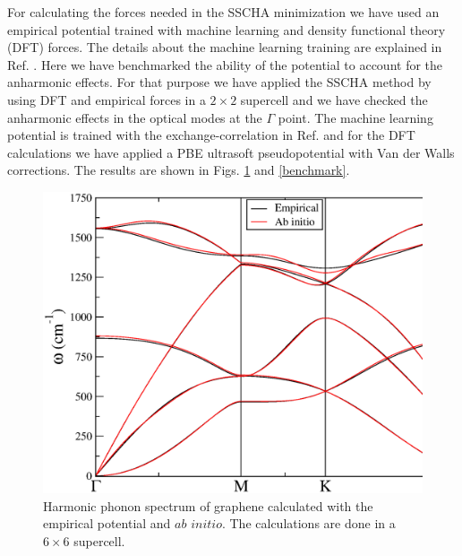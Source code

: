 For calculating the forces needed in the SSCHA minimization\cite{errea2014anharmonic} we have used an empirical 
potential trained with machine learning and density functional theory (DFT) forces. The details about the machine 
learning training are explained in Ref. \cite{rowe2018development}. Here we have benchmarked the ability of 
the potential to account for the anharmonic effects. For that purpose we have applied the SSCHA method by using 
DFT and empirical forces in a $2\times2$ supercell and we have checked the anharmonic effects in the optical 
modes at the $\Gamma$ point. The machine learning potential is trained with the exchange-correlation in 
Ref. \cite{dion2004van} and for the DFT calculations we have applied a PBE\cite{perdew1996generalized} 
ultrasoft pseudopotential\cite{vanderbilt1990soft} with Van der Walls corrections\cite{barone2009role}. The 
results are shown in Figs. \ref{benchmark-spectrum} and \ref{benchmark}.
\begin{figure}[ht]
\includegraphics[width=0.99\linewidth]{Figures/abinito-vs-empirical.eps}
\caption[Harmonic phonon spectrum of graphene calculated with the empirical                                 
        potential and $ab$ $initio$.]{Harmonic phonon spectrum of graphene calculated with the empirical potential 
	and $ab$ $initio$. The calculations are done in a $6\times6$ supercell.}
\label{benchmark-spectrum}
\end{figure}
